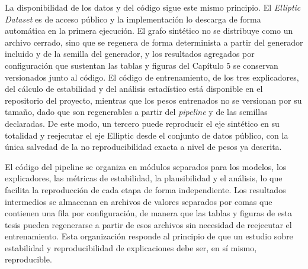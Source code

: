 La disponibilidad de los datos y del código sigue este mismo principio. El \textit{Elliptic Dataset} es de acceso público y la implementación lo descarga de forma automática en la primera ejecución. El grafo sintético no se distribuye como un archivo cerrado, sino que se regenera de forma determinista a partir del generador incluido y de la semilla del generador, y los resultados agregados por configuración que sustentan las tablas y figuras del Capítulo 5 se conservan versionados junto al código. El código de entrenamiento, de los tres explicadores, del cálculo de estabilidad y del análisis estadístico está disponible en el repositorio del proyecto, mientras que los pesos entrenados no se versionan por su tamaño, dado que son regenerables a partir del \textit{pipeline} y de las semillas declaradas. De este modo, un tercero puede reproducir el eje sintético en su totalidad y reejecutar el eje Elliptic desde el conjunto de datos público, con la única salvedad de la no reproducibilidad exacta a nivel de pesos ya descrita.

El código del pipeline se organiza en módulos separados para los modelos, los explicadores, las métricas de estabilidad, la plausibilidad y el análisis, lo que facilita la reproducción de cada etapa de forma independiente. Los resultados intermedios se almacenan en archivos de valores separados por comas que contienen una fila por configuración, de manera que las tablas y figuras de esta tesis pueden regenerarse a partir de esos archivos sin necesidad de reejecutar el entrenamiento. Esta organización responde al principio de que un estudio sobre estabilidad y reproducibilidad de explicaciones debe ser, en sí mismo, reproducible.
